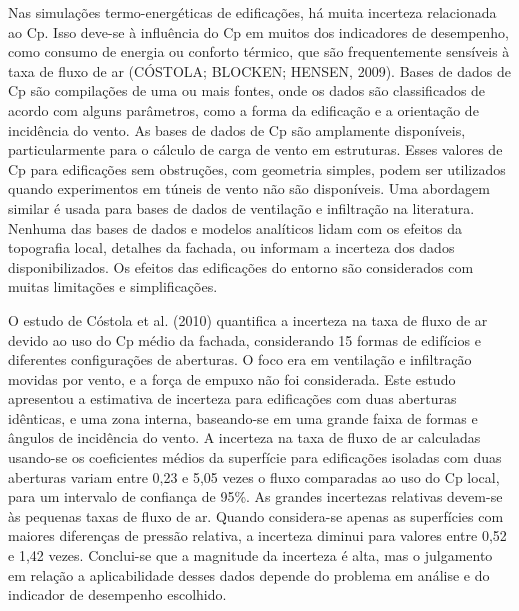 \documentclass[brazil,hardcopy,openany,a5paper]{ufscthesis}
\begin{document}
	Nas simulações termo-energéticas de edificações, há muita incerteza relacionada ao Cp. Isso deve-se à influência do Cp em muitos dos indicadores de desempenho, como consumo de energia ou conforto térmico, que são frequentemente sensíveis à taxa de fluxo de ar (CÓSTOLA; BLOCKEN; HENSEN, 2009). Bases de dados de Cp são compilações de uma ou mais fontes, onde os dados são classificados de acordo com alguns parâmetros, como a forma da edificação e a orientação de incidência do vento. As bases de dados de Cp são amplamente disponíveis, particularmente para o cálculo de carga de vento em estruturas. Esses valores de Cp para edificações sem obstruções, com geometria simples, podem ser utilizados quando experimentos em túneis de vento não são disponíveis. Uma abordagem similar é usada para bases de dados de ventilação e infiltração na literatura. Nenhuma das bases de dados e modelos analíticos lidam com os efeitos da topografia local, detalhes da fachada, ou informam a incerteza dos dados disponibilizados. Os efeitos das edificações do entorno são considerados com muitas limitações e simplificações.
	
	O estudo de Cóstola et al. (2010) quantifica a incerteza na taxa de fluxo de ar devido ao uso do Cp médio da fachada, considerando 15 formas de edifícios e diferentes configurações de aberturas. O foco era em ventilação e infiltração movidas por vento, e a força de empuxo não foi considerada. Este estudo apresentou a estimativa de incerteza para edificações com duas aberturas idênticas, e uma zona interna, baseando-se em uma grande faixa de formas e ângulos de incidência do vento. A incerteza na taxa de fluxo de ar calculadas usando-se os coeficientes médios da superfície para edificações isoladas com duas aberturas variam entre 0,23 e 5,05 vezes o fluxo comparadas ao uso do Cp local, para um intervalo de confiança de 95\%. As grandes incertezas relativas devem-se às pequenas taxas de fluxo de ar. Quando considera-se apenas as superfícies com maiores diferenças de pressão relativa, a incerteza diminui para  valores entre 0,52 e 1,42 vezes. Conclui-se que a magnitude da incerteza é alta, mas o julgamento em relação a aplicabilidade desses dados depende do problema em análise e do indicador de desempenho escolhido.
	
\end{document}
